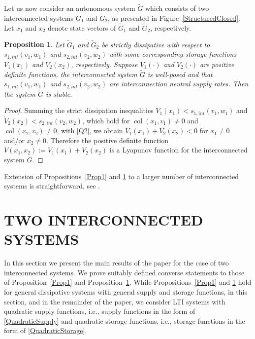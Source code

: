 \documentclass[11pt,a4paper,oneside,DIV=12,headings=small]{scrartcl}
\newcommand{\col}{\operatorname{col}}
\newtheorem{proposition}[theorem]{Proposition}
\theoremstyle{plain}
\begin{document}
Let us now consider an autonomous system $\tilde{G}$ which consists of two interconnected systems $\tilde{G}_1$ and $\tilde{G}_2$, as presented in Figure~\ref{StructuredClosed}. Let $x_1$ and $x_2$ denote state vectors of $\tilde{G}_1$ and $\tilde{G}_2$, respectively.  

\begin{proposition}
\label{Prop2}
Let $\tilde{G}_1$ and $\tilde{G}_2$ be \emph{strictly} dissipative with respect to $s_{1,int}(v_1,w_1)$ and $s_{2,int}(v_2,w_2)$ with some corresponding storage functions $V_1(x_1)$ and $V_2(x_2)$, respectively. Suppose $V_1(\cdot)$ and $V_2(\cdot)$ are positive definite functions, the interconnected system $\tilde{G}$ is well-posed and that $s_{1,int}(v_1,w_1)$ and $s_{2,int}(v_2,w_2)$ are interconnection neutral supply rates. Then the system $\tilde{G}$ is stable. 
\end{proposition} 
\begin{proof} Summing the strict dissipation inequalities $\dot{V}_1(x_1)<s_{1,int}(v_1,w_1)$ and $\dot{V}_2(x_2)<s_{2,int}(v_2,w_2)$, which hold for $\col(x_1,v_1)\neq 0$ and $\col(x_2,v_2)\neq 0$, with \eqref{Q2}, we obtain $\dot{V}_1(x_1)+\dot{V}_2(x_2)<0$ for $x_1\neq 0$ and/or $x_2 \neq 0$. Therefore the positive definite function $V(x_1,x_2):=V_1(x_1)+V_2(x_2)$ is a Lyapunov function for the interconnected system $G$.
\end{proof}
\medskip

Extension of Propositions~\ref{Prop1} and \ref{Prop2} to a larger number of interconnected systems is straightforward, see \cite{Willems_1}. 


\section{TWO INTERCONNECTED SYSTEMS}
\label{Sec3}
In this section we present the main results of the paper for the case of two interconnected systems. We prove suitably defined converse statements to those of Proposition~\ref{Prop1} and Proposition~\ref{Prop2}. While Propositions~\ref{Prop1} and \ref{Prop2} hold for general dissipative systems with general supply and storage functions, in this section, and in the remainder of the paper, we consider LTI systems with quadratic supply functions, i.e., supply functions in the form of \eqref{QuadraticSupply} and quadratic storage functions, i.e., storage functions in the form of \eqref{QuadraticStorage}.     
\end{document}
